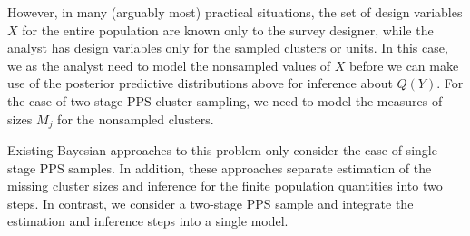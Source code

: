 \documentclass[12pt,a4paper]{article}
\begin{document}

However, in many (arguably most) practical situations, the set of design variables $X$ for the entire population are known only to the survey designer, while the analyst has design variables only for the sampled clusters or units. In this case, we as the analyst need to model the nonsampled values of $X$ before we can make use of the posterior predictive distributions above for inference about $Q(Y)$. For the case of two-stage PPS cluster sampling, we need to model the measures of sizes $M_j$ for the nonsampled clusters.

Existing Bayesian approaches to this problem \citep{zangeneh2011, zangeneh2015} only consider the case of single-stage PPS samples. In addition, these approaches separate estimation of the missing cluster sizes and inference for the finite population quantities into two steps.  In contrast, we consider a two-stage PPS sample and integrate the estimation and inference steps into a single model.
\end{document}
